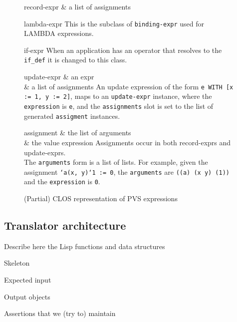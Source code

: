 \documentclass[12pt,a4paper,titlepage]{article}
\begin{document}
\begin{figure}
\begin{class}{record-expr}{}{}{ & a list of assignments}
\end{class}

\begin{class}{lambda-expr}{}{}{}
This is the subclass of \texttt{binding-expr} used for LAMBDA expressions.
\end{class}

\begin{class}{if-expr}{}{}{}
When an application has an operator that resolves to the \texttt{if\_def} it is changed to this class.
\end{class}

\begin{class}{update-expr}{}{}
{ & an expr \\
  & a list of assignments}
An update expression of the form \texttt{e WITH [x := 1, y := 2]}, maps to
an \texttt{update-expr} instance, where the \texttt{expression} is
\texttt{e}, and the \texttt{assignments} slot is set to the list of
generated \texttt{assigment} instances.
\end{class}

\begin{class}{assignment}{}{}
{ & the list of arguments \\
  & the value expression}
Assignments occur in both record-exprs and update-exprs.\\
The \texttt{arguments} form is a list of lists.  For example, given the assignment \texttt{`a(x, y)`1 := 0}, the \texttt{arguments} are
\texttt{((a) (x y) (1))} and the \texttt{expression} is \texttt{0}.
\end{class}

\caption{(Partial) CLOS representation of PVS expressions}
\end{figure}


\subsection{Translator architecture}

Describe here the Lisp functions and data structures

Skeleton

Expected input

Output objects

Assertions that we (try to) maintain
\end{document}
